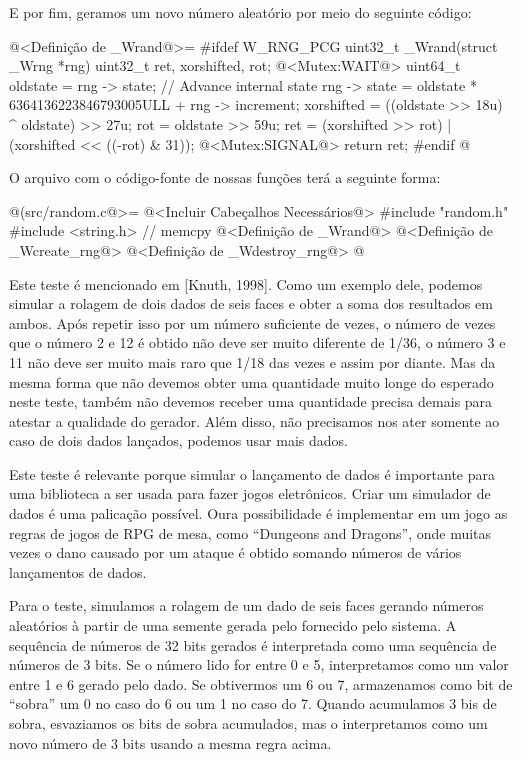 E por fim, geramos um novo número aleatório por meio do seguinte código:

\iniciocodigo
@<Definição de \_Wrand@>=
#ifdef W_RNG_PCG
uint32_t _Wrand(struct _Wrng *rng){
  uint32_t ret, xorshifted, rot;
  @<Mutex:WAIT@>
  uint64_t oldstate = rng -> state;
  // Advance internal state
  rng -> state = oldstate * 6364136223846793005ULL + rng -> increment;
  xorshifted = ((oldstate >> 18u) ^ oldstate) >> 27u;
  rot = oldstate >> 59u;
  ret = (xorshifted >> rot) | (xorshifted << ((-rot) & 31));
  @<Mutex:SIGNAL@>
  return ret;
}
#endif
@
\fimcodigo


O arquivo com o código-fonte de nossas funções terá a seguinte forma:


\iniciocodigo
@(src/random.c@>=
@<Incluir Cabeçalhos Necessários@>
#include "random.h"
#include <string.h> // memcpy
@<Definição de \_Wrand@>
@<Definição de \_Wcreate\_rng@>
@<Definição de \_Wdestroy\_rng@>
@
\fimcodigo



Este teste é mencionado em [Knuth, 1998]. Como um exemplo dele,
podemos simular a rolagem de dois dados de seis faces e obter a soma
dos resultados em ambos. Após repetir isso por um número suficiente de
vezes, o número de vezes que o número 2 e 12 é obtido não deve ser
muito diferente de 1/36, o número 3 e 11 não deve ser muito mais raro
que 1/18 das vezes e assim por diante. Mas da mesma forma que não
devemos obter uma quantidade muito longe do esperado neste teste,
também não devemos receber uma quantidade precisa demais para atestar
a qualidade do gerador. Além disso, não precisamos nos ater somente ao
caso de dois dados lançados, podemos usar mais dados.

Este teste é relevante porque simular o lançamento de dados é
importante para uma biblioteca a ser usada para fazer jogos
eletrônicos. Criar um simulador de dados é uma palicação
possível. Oura possibilidade é implementar em um jogo as regras de
jogos de RPG de mesa, como ``Dungeons and Dragons'', onde muitas vezes
o dano causado por um ataque é obtido somando números de vários
lançamentos de dados.

Para o teste, simulamos a rolagem de um dado de seis faces gerando
números aleatórios à partir de uma semente gerada
pelo  fornecido pelo sistema. A sequência de
números de 32 bits gerados é interpretada como uma sequência de
números de 3 bits. Se o número lido for entre 0 e 5, interpretamos
como um valor entre 1 e 6 gerado pelo dado. Se obtivermos um 6 ou 7,
armazenamos como bit de ``sobra'' um 0 no caso do 6 ou um 1 no caso do
7. Quando acumulamos 3 bis de sobra, esvaziamos os bits de sobra
acumulados, mas o interpretamos como um novo número de 3 bits usando a
mesma regra acima.

